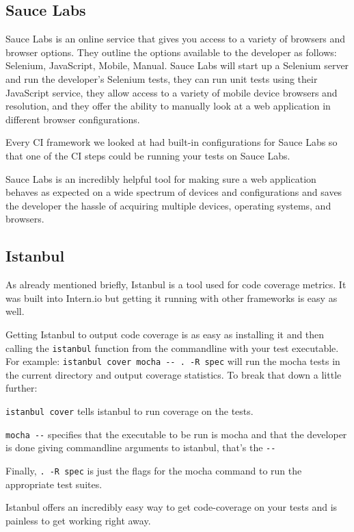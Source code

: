 \documentclass[12pt]{ucthesis}
\begin{document}
\subsection{Sauce Labs}
Sauce Labs\cite{SauceLabs} is an online service that gives you access to a variety of browsers and browser options. They outline the options available to the developer as follows: Selenium, JavaScript, Mobile, Manual. Sauce Labs will start up a Selenium server and run the developer's Selenium tests, they can run unit tests using their JavaScript service, they allow access to a variety of mobile device browsers and resolution, and they offer the ability to manually look at a web application in different browser configurations.

Every CI framework we looked at had built-in configurations for Sauce Labs so that one of the CI steps could be running your tests on Sauce Labs.

Sauce Labs is an incredibly helpful tool for making sure a web application behaves as expected on a wide spectrum of devices and configurations and saves the developer the hassle of acquiring multiple devices, operating systems, and browsers.

\subsection{Istanbul}
As already mentioned briefly, Istanbul\cite{Istanbul} is a tool used for code coverage metrics. It was built into Intern.io but getting it running with other frameworks is easy as well.

Getting Istanbul to output code coverage is as easy as installing it and then calling the \lstinline{istanbul} function from the commandline with your test executable.
For example: \lstinline{istanbul cover mocha -- . -R spec} will run the mocha tests in the current directory and output coverage statistics. To break that down a little further:

\lstinline{istanbul cover} tells istanbul to run coverage on the tests.

\lstinline{mocha --} specifies that the executable to be run is mocha and that the developer is done giving commandline arguments to istanbul, that's the \lstinline{--}

Finally, \lstinline{. -R spec} is just the flags for the mocha command to run the appropriate test suites.

Istanbul offers an incredibly easy way to get code-coverage on your tests and is painless to get working right away.
\end{document}
